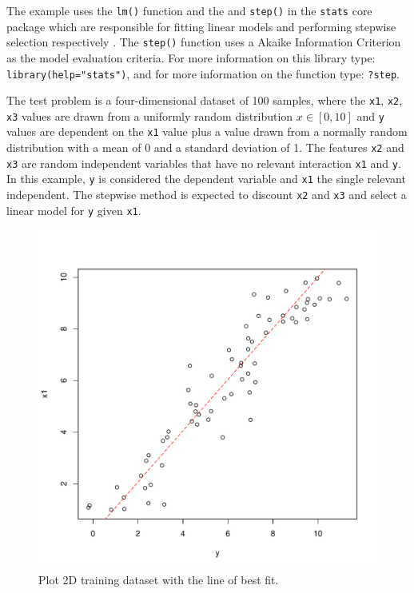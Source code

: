The example uses the \texttt{lm()} function and the and \texttt{step()} in the \texttt{stats} core package which are responsible for fitting linear models and performing stepwise selection respectively \cite{RDevelopmentCoreTeam2011a}. The \texttt{step()} function uses a Akaike Information Criterion as the model evaluation criteria. For more information on this library type: \texttt{library(help="stats")}, and for more information on the function type: \texttt{?step}.

The test problem is a four-dimensional dataset of 100 samples, where the \texttt{x1}, \texttt{x2}, \texttt{x3} values are drawn from a uniformly random distribution $x \in [0,10]$ and \texttt{y} values are dependent on the \texttt{x1} value plus a value drawn from a normally random distribution with a mean of 0 and a standard deviation of 1. The features \texttt{x2} and \texttt{x3} are random independent variables that have no relevant interaction \texttt{x1} and \texttt{y}. In this example, \texttt{y} is considered the dependent variable and \texttt{x1} the single relevant independent. The stepwise method is expected to discount \texttt{x2} and \texttt{x3} and select a linear model for \texttt{y} given \texttt{x1}.



\begin{figure}[htp]
\centering
\includegraphics[scale=0.45]{a_regression/stepwise_regression_result.pdf}
\caption{Plot 2D training dataset with the line of best fit.}
\label{plot:stepwise_regression_result}
\end{figure}

